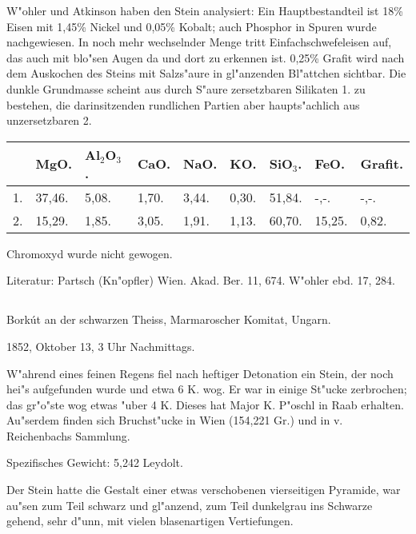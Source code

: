 \documentclass[a4paper, 11pt, oneside]{article}
\begin{document}
W"ohler und Atkinson haben den Stein analysiert: Ein Hauptbestandteil ist 18\% Eisen mit 1,45\% Nickel und 0,05\% Kobalt; auch Phosphor in Spuren wurde nachgewiesen. In noch mehr wechselnder Menge tritt Einfachschwefeleisen auf, das auch mit blo"sen Augen da und dort zu erkennen ist. 0,25\% Grafit wird nach dem Auskochen des Steins mit Salzs"aure in gl"anzenden Bl"attchen sichtbar. Die dunkle Grundmasse scheint aus durch S"aure zersetzbaren Silikaten 1. zu bestehen, die darinsitzenden rundlichen Partien aber haupts"achlich aus unzersetzbaren 2.

\begin{table}[!ht]
    \centering\swabfamily\Large
    \begin{tabular}{l l l l l l l l l}
         & MgO. & Al$_{2}$O$_{3}$. & CaO. & NaO. & KO. & SiO$_{3}$. & FeO. & Grafit. \\ \hline
        1. & 37,46. & 5,08. & 1,70. & 3,44. & 0,30. & 51,84. & -,-. & -,-. \\
        2. & 15,29. & 1,85. & 3,05. & 1,91. & 1,13. & 60,70. & 15,25. & 0,82. \\
    \end{tabular}
\end{table}

Chromoxyd wurde nicht gewogen.

\normalsize
Literatur: Partsch (Kn"opfler) Wien. Akad. Ber. 11, 674. W"ohler ebd. 17, 284.

\subsection{}
\LARGE
\paragraph{}
Borkút an der schwarzen Theiss, Marmaroscher Komitat, Ungarn.

1852, Oktober 13, 3 Uhr Nachmittags.

W"ahrend eines feinen Regens fiel nach heftiger Detonation ein Stein, der noch hei"s aufgefunden wurde und etwa 6 K. wog. Er war in einige St"ucke zerbrochen; das gr"o"ste wog etwas "uber 4 K. Dieses hat Major K. P"oschl in Raab erhalten. Au"serdem finden sich Bruchst"ucke in Wien (154,221 Gr.) und in v. Reichenbachs Sammlung.

Spezifisches Gewicht: 5,242 Leydolt.

Der Stein hatte die Gestalt einer etwas verschobenen vierseitigen Pyramide, war au"sen zum Teil schwarz und gl"anzend, zum Teil dunkelgrau ins Schwarze gehend, sehr d"unn, mit vielen blasenartigen Vertiefungen.
\end{document}
